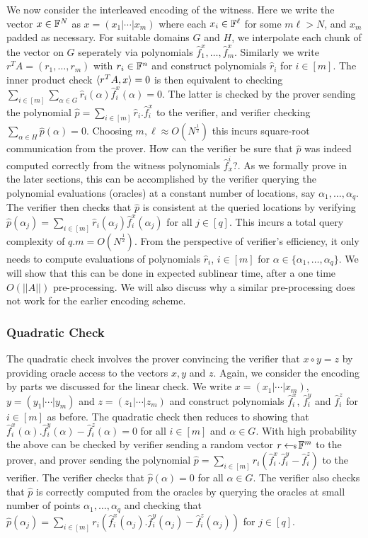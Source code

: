We now consider the interleaved encoding of the witness. 
Here we write the vector $x\in \mathbb{F}^N$ as $x=(x_1|\cdots|x_m)$
where each $x_i\in \mathbb{F}^\ell$ for some $m\ell > N$, and $x_m$ padded as necessary. For
suitable domains $G$ and $H$, we interpolate each chunk of the vector on $G$ 
seperately via 
polynomials $\hat{f}^x_1,\ldots,\hat{f}^x_m$. Similarly we write
$r^TA=(r_1,\ldots,r_m)$ with $r_i\in \mathbb{F}^n$ and construct polynomials $\hat{r}_i$
for $i\in [m]$. The inner product check $\langle r^TA,x\rangle=0$ is then equivalent to checking
$\sum_{i\in [m]}\sum_{\alpha\in G}\hat{r}_i(\alpha)\hat{f}^x_i(\alpha)=0$. The
latter is checked by the prover sending the polynomial $\hat{p}=\sum_{i\in
[m]}\hat{r}_i.\hat{f}^x_i$ to the verifier, and verifier checking
$\sum_{\alpha\in H}\hat{p}(\alpha)=0$. Choosing $m,\ell\approx O(N^\frac{1}{2})$ this
incurs square-root communication from the prover. How can the verifier be
sure that $\hat{p}$ was indeed computed correctly from the witness polynomials 
$\hat{f}^i_x$?. As we formally prove in the later sections, this can be
accomplished by the verifier querying the polynomial evaluations (oracles) at a constant
number of locations, say $\alpha_1,\ldots,\alpha_q$. The verifier then checks
that $\hat{p}$ is consistent at the queried locations by verifying
$\hat{p}(\alpha_j)=\sum_{i\in [m]}\hat{r}_i(\alpha_j)\hat{f}^x_i(\alpha_j)$ for
all $j\in [q]$. This incurs a total query complexity of $q.m=O(N^\frac{1}{2})$.
From the perspective of 
verifier's efficiency, it only needs to compute evaluations of
polynomials 
$\hat{r}_i$, $i\in [m]$ for $\alpha\in \{\alpha_1,\ldots,\alpha_q\}$. We will show
that this can be done in expected sublinear time, after a one time $O(||
A||)$ 
pre-processing. We will also discuss why a similar pre-processing does not work
for the earlier encoding scheme.

\subsubsection{Quadratic Check}
The quadratic check involves the prover convincing the verifier that $x\circ
y=z$ by providing oracle access to the vectors $x,y$ and $z$. Again, we
consider the encoding by parts we discussed for the linear check. We write
$x=(x_1|\cdots|x_m)$, $y=(y_1|\cdots|y_m)$ and $z=(z_1|\cdots|z_m)$ and
construct polynomials $\hat{f}^x_i$, $\hat{f}^y_i$ and $\hat{f}^z_i$ for $i\in
[m]$ as before. The quadratic check then reduces to showing that
$\hat{f}^x_i(\alpha).\hat{f}^y_i(\alpha)-\hat{f}^z_i(\alpha)=0$ for all $i\in
[m]$ and $\alpha\in G$. With high probability the above can be checked by
verifier sending a random vector $r\hskip2.3pt{\gets\!\!\mbox{\tiny${\$}$\normalsize}}\, \mathbb{F}^m$ to the prover, and prover
sending the polynomial $\hat{p}=\sum_{i\in
[m]}r_i(\hat{f}^x_i.\hat{f}^y_i-\hat{f}^z_i)$ to the verifier. The verifier
checks that $\hat{p}(\alpha)=0$ for all $\alpha\in G$. The verifier also checks
that $\hat{p}$ is correctly computed from the oracles by querying the oracles
at small number of points $\alpha_1,\ldots,\alpha_q$ and checking that
$\hat{p}(\alpha_j)=\sum_{i\in
[m]}r_i(\hat{f}^x_i(\alpha_j).\hat{f}^y_i(\alpha_j)-\hat{f}^z_i(\alpha_j))$ for
$j\in [q]$.

